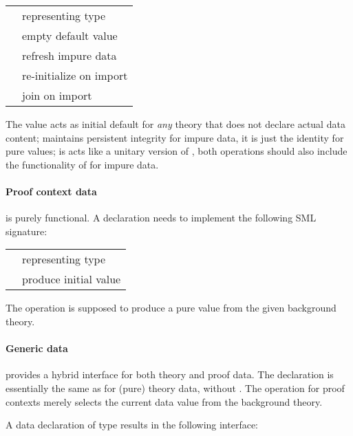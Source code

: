 \begin{isabellebody}
\begin{isamarkuptext}
  \medskip
  \begin{tabular}{ll}
  \isa{{\isasymtype}\ T} & representing type \\
  \isa{{\isasymval}\ empty{\isacharcolon}\ T} & empty default value \\
  \isa{{\isasymval}\ copy{\isacharcolon}\ T\ {\isasymrightarrow}\ T} & refresh impure data \\
  \isa{{\isasymval}\ extend{\isacharcolon}\ T\ {\isasymrightarrow}\ T} & re-initialize on import \\
  \isa{{\isasymval}\ merge{\isacharcolon}\ T\ {\isasymtimes}\ T\ {\isasymrightarrow}\ T} & join on import \\
  \end{tabular}
  \medskip

  \noindent The  value acts as initial default for
  \emph{any} theory that does not declare actual data content;  maintains persistent integrity for impure data, it is just
  the identity for pure values;  is acts like a
  unitary version of , both operations should also
  include the functionality of  for impure data.

  \paragraph{Proof context data} is purely functional.  A declaration
  needs to implement the following SML signature:

  \medskip
  \begin{tabular}{ll}
  \isa{{\isasymtype}\ T} & representing type \\
  \isa{{\isasymval}\ init{\isacharcolon}\ theory\ {\isasymrightarrow}\ T} & produce initial value \\
  \end{tabular}
  \medskip

  \noindent The  operation is supposed to produce a pure
  value from the given background theory.

  \paragraph{Generic data} provides a hybrid interface for both theory
  and proof data.  The declaration is essentially the same as for
  (pure) theory data, without .  The 
  operation for proof contexts merely selects the current data value
  from the background theory.

  \bigskip A data declaration of type  results in the
  following interface:


\end{isamarkuptext}
\end{isabellebody}
